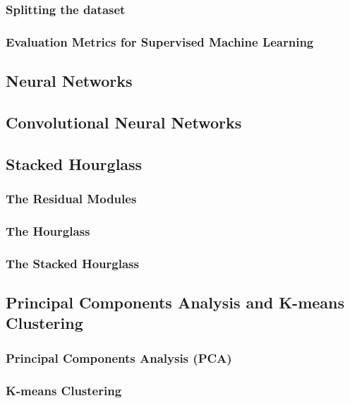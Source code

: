 \documentclass[main.tex]{subfiles}
\begin{document}
\subsubsection{Splitting the dataset}
\subsubsection{Evaluation Metrics for Supervised Machine Learning}

\subsection{Neural Networks}
\subsection{Convolutional Neural Networks}
\subsection{Stacked Hourglass}
\subsubsection{The Residual Modules}
\subsubsection{The Hourglass}
\subsubsection{The Stacked Hourglass}

\subsection{Principal Components Analysis and K-means Clustering}
\subsubsection{Principal Components Analysis (PCA)}
\subsubsection{K-means Clustering}
\end{document}
